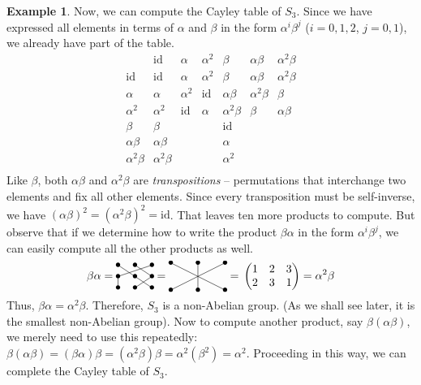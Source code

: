 \documentclass[svgnames]{article}
\theoremstyle{definition}
\newtheorem{Example}[Theorem]{Example}
\theoremstyle{remark}
\newcommand{\id}{\mathrm{id}}
\begin{document}
\begin{appendices}
\begin{Example}
Now, we can compute the Cayley table of $S_3$. Since we have expressed all elements in terms of $\alpha$ and $\beta$ in the form $\alpha^i \beta^j$ ($i = 0, 1, 2$, $j = 0, 1$), we already have part of the table.
\begin{equation*}
\begin{array}{r|cccccc}
		&	\id		&	\alpha	&	\alpha^2	&	\beta	&	\alpha\beta	&	\alpha^2\beta\\
\hline
\id		&	\id		&	\alpha	&	\alpha^2	&	\beta	&	\alpha\beta	&	\alpha^2\beta\\
\alpha	&	\alpha	&	\alpha^2	&	\id		&	\alpha\beta	&	\alpha^2\beta	&	\beta\\
\alpha^2&	\alpha^2	&	\id	&	\alpha		&	\alpha^2\beta	&	\beta	&	\alpha\beta\\
\beta	&	\beta	&			&				&	\id		&					&	\\
\alpha\beta	&	\alpha\beta	&		&			&	\alpha	&					&	\\	
\alpha^2\beta	&	\alpha^2\beta	&		&			&	\alpha^2	&		&	\\
\end{array}
\end{equation*}
Like $\beta$, both $\alpha\beta$ and $\alpha^2\beta$ are \emph{transpositions} -- permutations that interchange two elements and fix all other elements. Since every transposition must be self-inverse, we have $(\alpha\beta)^2 = (\alpha^2\beta)^2 = \id$. That leaves ten more products to compute. But observe that if we determine how to write the product $\beta\alpha$ in the form $\alpha^i \beta^j$, we can easily compute all the other products as well.
\begin{equation*}
\beta\alpha  = \,\vcenter{\xymatrix@R=1em@C=1.5em{
		*=0{\bullet} \ar@{-}[dr]	&	*=0{\bullet} \ar@{-}[dr]	&	*=0{\bullet} \ar@{-}[dll]\\
		*=0{\bullet} \ar@{-}[d]		&	*=0{\bullet} \ar@{-}[dr]	&	*=0{\bullet} \ar@{-}[dl]\\
		*=0{\bullet}				&	*=0{\bullet}				&	*=0{\bullet}\\		
}}\, = \,\vcenter{\xymatrix{
*=0{\bullet} \ar@{-}[drr]	&	*=0{\bullet} \ar@{-}[d]	&	*=0{\bullet} \ar@{-}[dll]\\
*=0{\bullet}				&	*=0{\bullet}				&	*=0{\bullet}\\
}}\, = \,\begin{pmatrix}
1 & 2 & 3\\
2 & 3 & 1
\end{pmatrix} = \alpha^2 \beta
\end{equation*}
Thus, $\beta\alpha = \alpha^2\beta$. Therefore, $S_3$ is a non-Abelian group. {\small (As we shall see later, it is the smallest non-Abelian group)}. Now to compute another product, say $\beta(\alpha\beta)$, we merely need to use this repeatedly: $\beta(\alpha\beta) = (\beta\alpha)\beta = (\alpha^2\beta)\beta = \alpha^2(\beta^2) = \alpha^2$. Proceeding in this way, we can complete the Cayley table of $S_3$.

\end{Example}
\end{appendices}
\end{document}
